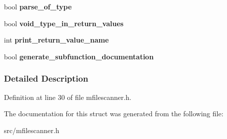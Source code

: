\begin{DoxyCompactItemize}
\item 
\hypertarget{struct_run_mode_a139b96ce70cbd3420b3cd8ddb5f1fd08}{}bool {\bfseries parse\+\_\+of\+\_\+type}\label{struct_run_mode_a139b96ce70cbd3420b3cd8ddb5f1fd08}

\item 
\hypertarget{struct_run_mode_a68605be046a299d3429a4be28d56922d}{}bool {\bfseries void\+\_\+type\+\_\+in\+\_\+return\+\_\+values}\label{struct_run_mode_a68605be046a299d3429a4be28d56922d}

\item 
\hypertarget{struct_run_mode_a068dd0a4a9827f7b1014227b6c47c0e9}{}int {\bfseries print\+\_\+return\+\_\+value\+\_\+name}\label{struct_run_mode_a068dd0a4a9827f7b1014227b6c47c0e9}

\item 
\hypertarget{struct_run_mode_a94cb9765ce00a3ffe330aee82983737c}{}bool {\bfseries generate\+\_\+subfunction\+\_\+documentation}\label{struct_run_mode_a94cb9765ce00a3ffe330aee82983737c}

\end{DoxyCompactItemize}


\subsubsection{Detailed Description}


Definition at line 30 of file mfilescanner.\+h.



The documentation for this struct was generated from the following file\+:\begin{DoxyCompactItemize}
\item 
src/mfilescanner.\+h\end{DoxyCompactItemize}
